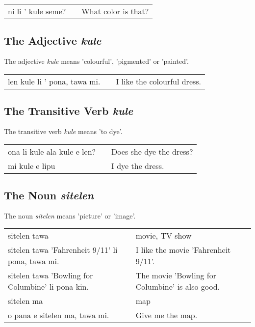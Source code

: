 \begin{supertabular}{p{5,5cm}|ll}
ni li ' kule seme? && What color is that? \\
\end{supertabular} 

%
\subsection*{The Adjective \textit{kule}}
%
%
The adjective \textit{kule} means 'colourful', 'pigmented' or 'painted'.

\begin{supertabular}{p{5,5cm}|ll}
len kule li ' pona, tawa mi. && I like the colourful dress. \\
\end{supertabular}

%
\subsection*{The Transitive Verb \textit{kule}}
%
%
The transitive verb \textit{kule} means 'to dye'. 

\begin{supertabular}{p{5,5cm}|ll}
ona li kule ala kule e len? && Does she dye the dress? \\
mi kule e lipu && I dye the dress. \\
\end{supertabular} 

%
\subsection*{The Noun \textit{sitelen}}
%
%
The noun \textit{sitelen} means 'picture' or 'image'. 

\begin{supertabular}{p{5,5cm}|ll}
sitelen tawa  && movie, TV show \\
sitelen tawa 'Fahrenheit 9/11' li pona, tawa mi. && I like the movie 'Fahrenheit 9/11'. \\
sitelen tawa 'Bowling for Columbine' li pona kin. && The movie 'Bowling for Columbine' is also good. \\
sitelen ma && map \\
o pana e sitelen ma, tawa mi. && Give me the map. \\
\end{supertabular} 

